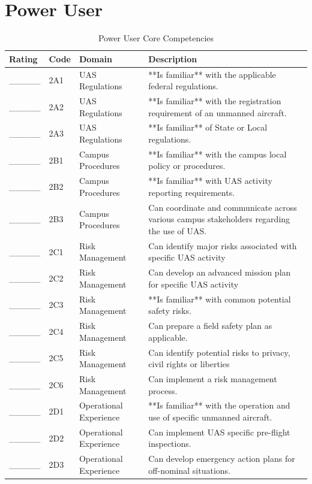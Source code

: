 \documentclass[
]{book}
\begin{document}
\hypertarget{power-user}{%
\section{Power User}\label{power-user}}

\begin{longtable}[t]{lll>{\raggedright\arraybackslash}p{25em}}
\caption{\label{tab:unnamed-chunk-7}Power User Core Competencies}\\
\toprule
Rating & Code & Domain & Description\\
\midrule
\_\_\_\_\_ & 2A1 & UAS Regulations & **Is familiar** with the applicable federal regulations.\\
\_\_\_\_\_ & 2A2 & UAS Regulations & **Is familiar** with the registration requirement of an unmanned aircraft.\\
\_\_\_\_\_ & 2A3 & UAS Regulations & **Is familiar** of State or Local regulations.\\
\_\_\_\_\_ & 2B1 & Campus Procedures & **Is familiar** with the campus local policy or procedures.\\
\_\_\_\_\_ & 2B2 & Campus Procedures & **Is familiar** with UAS activity reporting requirements.\\
\addlinespace
\_\_\_\_\_ & 2B3 & Campus Procedures & Can coordinate and communicate across various campus stakeholders regarding the use of UAS.\\
\_\_\_\_\_ & 2C1 & Risk Management & Can identify major risks associated with specific UAS activity\\
\_\_\_\_\_ & 2C2 & Risk Management & Can develop an advanced mission plan for specific UAS activity\\
\_\_\_\_\_ & 2C3 & Risk Management & **Is familiar** with common potential safety risks.\\
\_\_\_\_\_ & 2C4 & Risk Management & Can prepare a field safety plan as applicable.\\
\addlinespace
\_\_\_\_\_ & 2C5 & Risk Management & Can identify potential risks to privacy, civil rights or liberties\\
\_\_\_\_\_ & 2C6 & Risk Management & Can implement a risk management process.\\
\_\_\_\_\_ & 2D1 & Operational Experience & **Is familiar** with the operation and use of specific unmanned aircraft.\\
\_\_\_\_\_ & 2D2 & Operational Experience & Can implement UAS specific pre-flight inspections.\\
\_\_\_\_\_ & 2D3 & Operational Experience & Can develop emergency action plans for off-nominal situations.\\
\bottomrule
\end{longtable}
\end{document}
